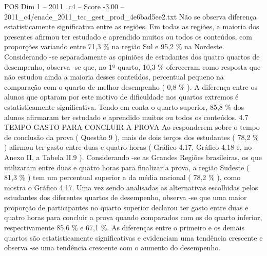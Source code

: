 \begin{textsample}{POS Dim 1 – 2011\_c4 – Score -3.00 – 2011\_c4/enade\_2011\_tec\_gest\_prod\_4e6bad5ee2.txt}
Não se observa diferença estatisticamente significativa entre as regiões.
Em todas as regiões, a maioria dos presentes afirmou ter estudado e aprendido muitos ou todos os conteúdos, com proporções variando entre 71,3 \% na região Sul e 95,2 \% na Nordeste.
Considerando -se separadamente as opiniões de estudantes dos quatro quartos de desempenho, observa -se que, no 1º quarto, 10,3 \% ofereceram como resposta que não estudou ainda a maioria desses conteúdos, percentual pequeno na comparação com o quarto de melhor desempenho ( 0,8 \% ).
A diferença entre os alunos que optaram por este motivo de dificuldade nos quartos extremos é estatisticamente significativa.
Tendo em conta o quarto superior, 85,8 \% dos alunos afirmaram ter estudado e aprendido muitos ou todos os conteúdos. 4.7 TEMPO GASTO PARA CONCLUIR A PROVA Ao responderem sobre o tempo de conclusão da prova ( Questão 9 ), mais de dois terços dos estudantes ( 78,2 \% ) afirmou ter gasto entre duas e quatro horas ( Gráfico 4.17, Gráfico 4.18 e, no Anexo II, a Tabela II.9 ).
Considerando -se as Grandes Regiões brasileiras, os que utilizaram entre duas e quatro horas para finalizar a prova, a região Sudeste ( 81,3 \% ) tem um percentual superior a da média nacional ( 78,2 \% ), como mostra o Gráfico 4.17.
Uma vez sendo analisadas as alternativas escolhidas pelos estudantes dos diferentes quartos de desempenho, observa -se que uma maior proporção de participantes no quarto superior declarou ter gasto entre duas e quatro horas para concluir a prova quando comparados com os do quarto inferior, respectivamente 85,6 \% e 67,1 \%.
As diferenças entre o primeiro e os demais quartos são estatisticamente significativas e evidenciam uma tendência crescente e observa -se uma tendência crescente com o aumento do desempenho.

\end{textsample}
